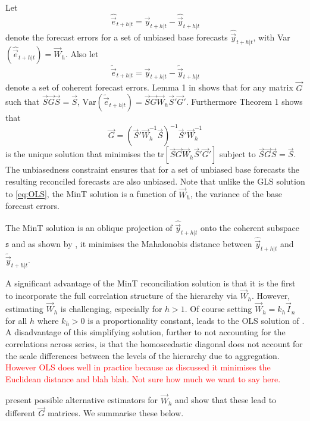 \documentclass[graybox]{svmult}
\begin{document}
Let
\begin{equation}\label{eq:base errors}
\hat{\vec{e}}_{t+h|t} = \vec{y}_{t+h|t}-\hat{\vec{y}}_{t+h|t}
\end{equation}
denote the forecast errors for a set of unbiased base forecasts $\hat{\vec{y}}_{t+h|t}$, with Var$(\hat{\vec{e}}_{t+h|t})=\vec{W}_h$. Also let \begin{equation*}
\tilde{\vec{e}}_{t+h|t} = \vec{y}_{t+h|t}-\tilde{\vec{y}}_{t+h|t}
\end{equation*} denote a set of coherent forecast errors. Lemma 1 in \cite{WicEtAl2019} shows that for any matrix $\vec{G}$ such that $\vec{S}\vec{G}\vec{S}=\vec{S}$, $\text{Var}(\tilde{\vec{e}}_{t+h|t})=\vec{S}\vec{G}\vec{W}_h\vec{S}'\vec{G}'
$. Furthermore Theorem 1 shows that
\begin{equation} \label{eq:MinT}
\vec{G} = (\vec{S}'{\vec{W}}^{-1}_h\vec{S})^{-1}\vec{S}'{\vec{W}}^{-1}_h
\end{equation}
is the unique solution that minimises the tr$[\vec{S}\vec{G}\vec{W}_h\vec{S}'\vec{G}']$ subject to $\vec{S}\vec{G}\vec{S}=\vec{S}$. The unbiasedness constraint ensures that for a set of unbiased base forecasts the resulting reconciled forecasts are also unbiased. Note that unlike the GLS solution to \eqref{eq:OLS}, the MinT solution is a function of $\vec{W}_h$, the variance of the base forecast errors.

The MinT solution is an oblique projection of $\hat{\vec{y}}_{t+h|t}$ onto the coherent subspace $\mathfrak{s}$ and as shown by \cite{WicEtAl2019}, it minimises the Mahalonobis distance between $\hat{\vec{y}}_{t+h|t}$ and $\tilde{\vec{y}}_{t+h|t}$.

A significant advantage of the MinT reconciliation solution is that it is the first to incorporate the full correlation structure of the hierarchy via ${\vec{W}}_{h}$. However, estimating ${\vec{W}}_{h}$ is challenging, especially for $h>1$. Of course setting ${\vec{W}}_{h}=k_h\vec{I}_n$ for all $h$ where $k_h>0$ is a proportionality constant, leads to the OLS solution of \cite{HynEtAl2011}. A disadvantage of this simplifying solution, further to not accounting for the correlations across series, is that the homoscedastic diagonal does not account for the scale differences between the levels of the hierarchy due to aggregation. \textcolor{red}{However OLS does well in practice because as discussed it minimises the Euclidean distance and blah blah. Not sure how much we want to say here.}

\citet{WicEtAl2019} present possible alternative estimators for ${\vec{W}}_{h}$ and show that these lead to different $\vec{G}$ matrices. We summarise these below.
\end{document}
